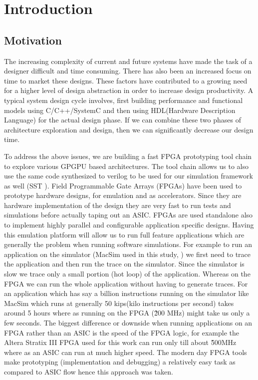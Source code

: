 \setcounter{equation}{0}

\chapter{Introduction}
\label{chap:introduction}

\section{Motivation}
The increasing complexity of current and future systems have made the task of a designer difficult and time consuming. There has also been an increased focus on time to market these designs. These factors have contributed to a growing need for a higher level of design abstraction in order to increase design productivity. A typical system design cycle involves, first building performance and functional models using C/C++/SystemC and then using HDL(Hardware Description Language) for the actual design phase. If we can combine these two phases of architecture exploration and design, then we can significantly decrease our design time.

To address the above issues, we are building a fast FPGA prototyping tool chain to explore various GPGPU based architectures. The tool chain allows us to also use the same code synthesized to verilog to be used for our simulation framework as well (SST \cite{SST}).
Field Programmable Gate Arrays (FPGAs) have been used to prototype hardware designs, for emulation and as accelerators. Since they are hardware implementation of the design they are very fast to run tests and simulations before actually taping out an ASIC. FPGAs are used standalone also to implement highly parallel and configurable application specific designs. Having this emulation platform will allow us to run full feature applications which are generally the problem when running software simulations. For example to run an application on the simulator (MacSim used in this study, \cite{macsim}) we first need to trace the application and then run the trace on the simulator. Since the simulator is slow we trace only a small portion (hot loop) of the application. Whereas on the FPGA we can run the whole application without having to generate traces. For an application which has say a billion instructions running on the simulator like MacSim which runs at generally 50 kips(kilo instructions per second) takes around 5 hours where as running on the FPGA (\~200 MHz) might take us only a few seconds. The biggest difference or downside when running applications on an FPGA rather than an ASIC is the speed of the FPGA logic, for example the Altera Stratix III FPGA used for this work can run only till about \~500MHz where as an ASIC can run at much higher speed. The modern day FPGA tools make prototyping (implementation and debugging) a relatively easy task as compared to ASIC flow hence this approach was taken.

